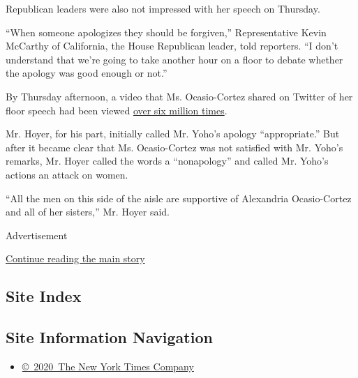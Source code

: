 Republican leaders were also not impressed with her speech on Thursday.

``When someone apologizes they should be forgiven,'' Representative
Kevin McCarthy of California, the House Republican leader, told
reporters. ``I don't understand that we're going to take another hour on
a floor to debate whether the apology was good enough or not.''

By Thursday afternoon, a video that Ms. Ocasio-Cortez shared on Twitter
of her floor speech had been viewed
\href{https://twitter.com/AOC/status/1286341062651523076?s=20}{over six
million times}.

Mr. Hoyer, for his part, initially called Mr. Yoho's apology
``appropriate.'' But after it became clear that Ms. Ocasio-Cortez was
not satisfied with Mr. Yoho's remarks, Mr. Hoyer called the words a
``nonapology'' and called Mr. Yoho's actions an attack on women.

``All the men on this side of the aisle are supportive of Alexandria
Ocasio-Cortez and all of her sisters,'' Mr. Hoyer said.

Advertisement

\protect\hyperlink{after-bottom}{Continue reading the main story}

\hypertarget{site-index}{%
\subsection{Site Index}\label{site-index}}

\hypertarget{site-information-navigation}{%
\subsection{Site Information
Navigation}\label{site-information-navigation}}

\begin{itemize}
\tightlist
\item
  \href{https://help.nytimes3xbfgragh.onion/hc/en-us/articles/115014792127-Copyright-notice}{©~2020~The
  New York Times Company}
\end{itemize}

